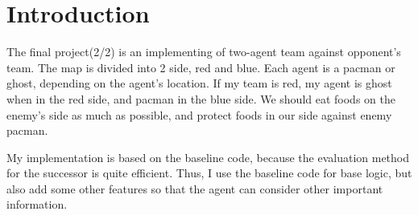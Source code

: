 \documentclass{article}
\theoremstyle{plain}
\theoremstyle{definition}
\theoremstyle{remark}
\begin{document}






\section{Introduction}
\label{submission}

The final project(2/2) is an implementing of two-agent team against opponent's team. The map is divided into 2 side, red and blue. Each agent is a pacman or ghost, depending on the agent's location. If my team is red, my agent is ghost when in the red side, and pacman in the blue side. We should eat foods on the enemy's side as much as possible, and protect foods in our side against enemy pacman.

My implementation is based on the baseline code, because the evaluation method for the successor is quite efficient. Thus, I use the baseline code for base logic, but also add some other features so that the agent can consider other important information.
\end{document}

